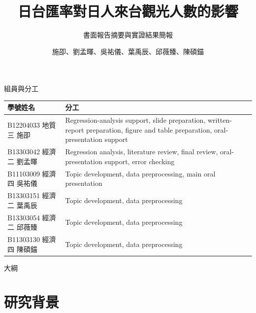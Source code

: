\documentclass[aspectratio=169]{ctexbeamer}
\title{日台匯率對日人來台觀光人數的影響}
\subtitle{書面報告摘要與實證結果簡報}
\author{施卲、劉孟暉、吳祐儀、葉禹辰、邱薇臻、陳碩錨}
\institute{}
\date{}
\begin{document}
\begin{frame}[plain]
  \vfill
  \centering
  {\color{PrimaryBlue}\inserttitle\par}
  \vspace{0.8em}
  {\large\insertsubtitle\par}
  \vspace{1.0em}
  {\normalsize\insertauthor\par}
  \vfill
\end{frame}

\begin{frame}{組員與分工}
\scriptsize
\begin{tabularx}{\textwidth}{>{\raggedright\arraybackslash}p{} >{\raggedright\arraybackslash}X}
\toprule
學號姓名 & 分工 \\
\midrule
B12204033 地質三 施卲 & Regression-analysis support, slide preparation, written-report preparation, figure and table preparation, oral-presentation support \\
B13303042 經濟二 劉孟暉 & Regression analysis, literature review, final review, oral-presentation support, error checking \\
B11103009 經濟四 吳祐儀 & Topic development, data preprocessing, main oral presentation \\
B13303151 經濟二 葉禹辰 & Topic development, data preprocessing \\
B13303054 經濟二 邱薇臻 & Topic development, data preprocessing \\
B11303130 經濟四 陳碩錨 & Topic development, data preprocessing \\
\bottomrule
\end{tabularx}
\end{frame}

\begin{frame}{大綱}
\tableofcontents
\end{frame}

\section{研究背景}
\end{document}
